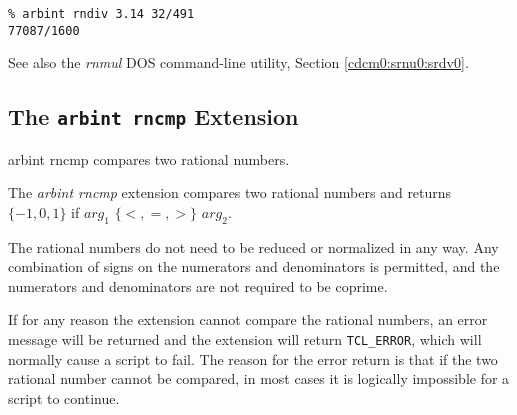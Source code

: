 \begin{tclcommandsampleinvocations}
\begin{scriptsize}
\begin{verbatim}
% arbint rndiv 3.14 32/491
77087/1600
\end{verbatim}
\end{scriptsize}
\end{tclcommandsampleinvocations}

\begin{tclcommandseealso}
See also the \emph{rnmul} DOS command-line utility, 
Section \cdcmzeroxrefhyphen{}\ref{cdcm0:srnu0:srdv0}.
\end{tclcommandseealso}


\subsection{The \texttt{arbint rncmp} Extension}
\label{cxtn0:srne0:srcm0}

\begin{tclcommandname}{arbint rncmp}%
compares two rational numbers.
\end{tclcommandname}

\begin{tclcommandsynopsis}
\end{tclcommandsynopsis}

\begin{tclcommanddescription}
The \emph{arbint rncmp} extension compares two rational numbers
and returns $\{-1, 0, 1\}$ if $arg_1$
$\{<, =, >\}$ $arg_2$.

The rational numbers do not need to be reduced or normalized in any way.
Any combination of signs on the numerators and denominators is permitted,
and the numerators and denominators are not required to be coprime.

If for any reason the extension cannot compare the rational numbers,
an error message will be returned and the extension will return
\texttt{TCL\_ERROR}, which will normally cause a script to fail.
The reason for the error return is that if the two rational number
cannot be compared, in most cases it is logically impossible for a script to
continue.
\end{tclcommanddescription}


